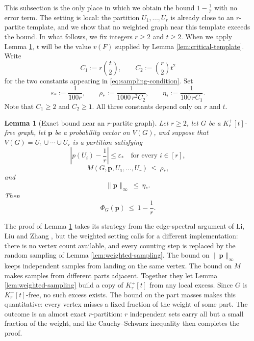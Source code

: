 \documentclass[11pt, a4paper]{article}
\newtheorem{lemma}[theorem]{Lemma}
\theoremstyle{definition}
\theoremstyle{plain}
\renewcommand{\le}{\leqslant}
\renewcommand{\ge}{\geqslant}
\newcommand{\pmax}{\lVert \bm{p} \rVert_{\infty}}
\begin{document}
This subsection is the only place in which we obtain the
bound $1-\frac1r$ with no error term. 
The setting is local: 
the partition $U_1,\ldots ,U_r$ is already 
close to an $r$-partite template, and we show that 
no weighted graph near this template exceeds the bound.  
In what follows, we fix integers $r\ge 2$ and
$t\ge 2$. When we apply Lemma \ref{lem:near-turan-weighted}, $t$ will be the value $v(F)$ supplied by Lemma \ref{lem:critical-template}. Write
\[
  C_1:=r\binom{t}{2},\qquad
  C_2:=\binom{r}{2}t^2
\] 
for the two constants appearing in
\eqref{eq:sampling-condition}. Set
\begin{equation}\label{eq:constants-near}
  \varepsilon_*:=\frac{1}{100r},
  \qquad
  \rho_*:=\frac{1}{1000\,r^2C_2},
  \qquad
  \eta_*:=\frac{1}{100\,rC_1}.
\end{equation}
Note that $C_1\ge 2$ and $C_2\ge 1$. All three
constants depend only on $r$ and $t$.


\begin{lemma}[Exact bound near an $r$-partite graph] 
\label{lem:near-turan-weighted}
Let $r\ge 2$, let $G$ be a $K_r^+[t]$-free graph, let
$\bm{p}$ be a probability vector on $V(G)$, and
suppose that $V(G)=U_1\cup\cdots\cup U_r$ is a
partition satisfying 
\begin{equation*}
  \left|p(U_i)-\frac1r\right|\le \varepsilon_*
  \quad\text{for every }i\in[r],
\end{equation*}
\begin{equation*}
  M(G,\bm{p},U_1,\ldots,U_r)\ \le\  \rho_*,
\end{equation*}
and
\begin{equation*}
  \pmax \ \le \ \eta_*.
\end{equation*}
Then 
$$\Phi_G(\bm{p}) \ \le \ 1-\frac{1}{r}.$$
\end{lemma}

The proof of Lemma \ref{lem:near-turan-weighted} takes
its strategy from the edge-spectral argument of Li, Liu
and Zhang \cite[Theorem 3.1]{LLZ-Critical}, 
but the weighted setting calls for a different implementation: there is no vertex count available, 
and every counting step is replaced by the random sampling of Lemma \ref{lem:weighted-sampling}. 
 The bound on $\pmax$ keeps independent samples from landing on the same vertex. The bound on $M$ makes
samples from different parts adjacent. Together they let Lemma \ref{lem:weighted-sampling} build a copy of $K_r^+[t]$ from any local excess. Since $G$ is $K_r^+[t]$-free, no such excess exists. The bound on the part masses makes this quantitative: every vertex misses a fixed fraction of the weight of some part. 
The outcome is an almost exact $r$-partition: $r$
independent sets carry all but a small fraction of
the weight, and the Cauchy--Schwarz inequality then completes the proof.
\end{document}

